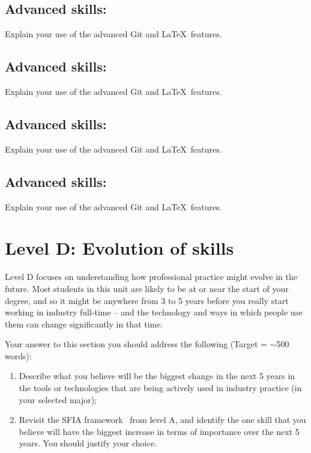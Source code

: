 \documentclass[a4paper, 11pt]{report}
\begin{document}
\subsection{Advanced skills: \studA}

Explain your use of the advanced Git and \LaTeX\ features. 

\subsection{Advanced skills: \studB}

Explain your use of the advanced Git and \LaTeX\ features. 

\subsection{Advanced skills: \studC}

Explain your use of the advanced Git and \LaTeX\ features. 

\subsection{Advanced skills: \studD}

Explain your use of the advanced Git and \LaTeX\ features. 




\newpage
\section{Level D: Evolution of skills}

Level D focuses on understanding how professional practice might evolve in the future. Most students in this unit are likely to be at or near the start of your degree, and so it might be anywhere from 3 to 5 years before you really start working in industry full-time -- and the technology and ways in which people use them can change significantly in that time. 

Your answer to this section you should address the following (Target = $\sim$500 words):
\begin{enumerate}
	\item Describe what you believe will be the biggest change in the next 5 years in the tools or technologies that are being actively used in industry practice (in your selected major);
	\item Revisit the SFIA framework~\cite{sfia} from level A, and identify the one skill that you believe will have the biggest increase in terms of importance over the next 5 years. You should justify your choice.
\end{enumerate}
\end{document}
